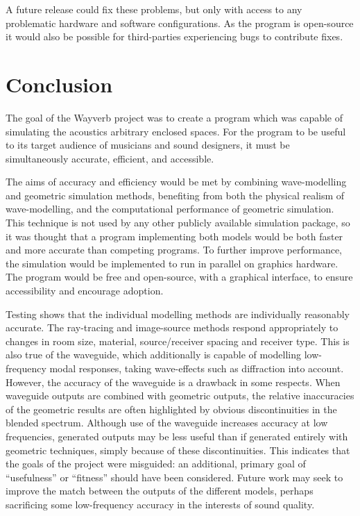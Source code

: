 \documentclass[]{scrreprt}
\begin{document}
A future release could fix these problems, but only with access to any
problematic hardware and software configurations. As the program is
open-source it would also be possible for third-parties experiencing
bugs to contribute fixes.

\section{Conclusion}\label{conclusion}

The goal of the Wayverb project was to create a program which was
capable of simulating the acoustics arbitrary enclosed spaces. For the
program to be useful to its target audience of musicians and sound
designers, it must be simultaneously accurate, efficient, and
accessible.

The aims of accuracy and efficiency would be met by combining
wave-modelling and geometric simulation methods, benefiting from both
the physical realism of wave-modelling, and the computational
performance of geometric simulation. This technique is not used by any
other publicly available simulation package, so it was thought that a
program implementing both models would be both faster and more accurate
than competing programs. To further improve performance, the simulation
would be implemented to run in parallel on graphics hardware. The
program would be free and open-source, with a graphical interface, to
ensure accessibility and encourage adoption.

Testing shows that the individual modelling methods are individually
reasonably accurate. The ray-tracing and image-source methods respond
appropriately to changes in room size, material, source/receiver spacing
and receiver type. This is also true of the waveguide, which
additionally is capable of modelling low-frequency modal responses,
taking wave-effects such as diffraction into account. However, the
accuracy of the waveguide is a drawback in some respects. When waveguide
outputs are combined with geometric outputs, the relative inaccuracies
of the geometric results are often highlighted by obvious
discontinuities in the blended spectrum. Although use of the waveguide
increases accuracy at low frequencies, generated outputs may be less
useful than if generated entirely with geometric techniques, simply
because of these discontinuities. This indicates that the goals of the
project were misguided: an additional, primary goal of ``usefulness'' or
``fitness'' should have been considered. Future work may seek to improve
the match between the outputs of the different models, perhaps
sacrificing some low-frequency accuracy in the interests of sound
quality.
\end{document}
